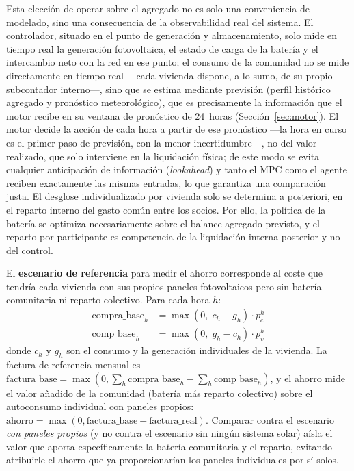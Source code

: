 \documentclass[12pt, a4paper, twoside]{report}
\begin{document}
Esta elección de operar sobre el agregado no es solo una conveniencia de
modelado, sino una consecuencia de la observabilidad real del sistema. El
controlador, situado en el punto de generación y almacenamiento, solo mide en
tiempo real la generación fotovoltaica, el estado de carga de la batería y el
intercambio neto con la red en ese punto; el consumo de la comunidad no se mide
directamente en tiempo real —cada vivienda dispone, a lo sumo, de su propio
subcontador interno—, sino que se estima mediante previsión (perfil histórico agregado
y pronóstico meteorológico), que es precisamente la información que el motor
recibe en su ventana de pronóstico de 24~horas (Sección~\ref{sec:motor}). El
motor decide la acción de cada hora a partir de ese pronóstico —la hora en curso
es el primer paso de previsión, con la menor incertidumbre—, no del valor
realizado, que solo interviene en la liquidación física; de este modo se evita
cualquier anticipación de información (\textit{lookahead}) y tanto el MPC como el
agente reciben exactamente las mismas entradas, lo que garantiza una comparación
justa. El
desglose individualizado por vivienda solo se determina a posteriori, en el
reparto interno del gasto común entre los socios. Por ello, la política de la
batería se optimiza necesariamente sobre el balance agregado previsto, y el
reparto por participante es competencia de la liquidación interna posterior y no
del control.

El \textbf{escenario de referencia} para medir el ahorro corresponde al coste
que tendría cada vivienda con sus propios paneles fotovoltaicos pero sin batería
comunitaria ni reparto colectivo. Para cada hora $h$:
\begin{align}
  \text{compra\_base}_h &= \max(0,\; c_h - g_h) \cdot p_c^h \\
  \text{comp\_base}_h   &= \max(0,\; g_h - c_h) \cdot p_v^h
\end{align}
donde $c_h$ y $g_h$ son el consumo y la generación individuales de la vivienda.
La factura de referencia mensual es
$\text{factura\_base} = \max(0, \sum_h \text{compra\_base}_h -
\sum_h \text{comp\_base}_h)$, y el ahorro mide el valor añadido de la comunidad
(batería más reparto colectivo) sobre el autoconsumo individual con paneles
propios: $\text{ahorro} = \max(0, \text{factura\_base} - \text{factura\_real})$.
Comparar contra el escenario \textit{con paneles propios} (y no contra el
escenario sin ningún sistema solar) aísla el valor que aporta específicamente la
batería comunitaria y el reparto, evitando atribuirle el ahorro que ya
proporcionarían los paneles individuales por sí solos.
\end{document}
